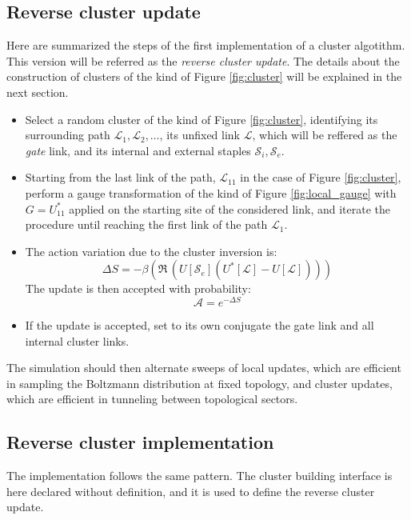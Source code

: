\subsection*{Reverse cluster update}

Here are summarized the steps of the first implementation of a cluster algotithm.
This version will be referred as the \emph{reverse cluster update}.
The details about the construction of clusters of the kind of Figure \ref{fig:cluster}
will be explained in the next section.

\begin{itemize}
    \item
        Select a random cluster of the kind of Figure \ref{fig:cluster},
        identifying its surrounding path $\mathcal L_1, \mathcal L_2, \ldots$,
        its unfixed link $\mathcal L$, which will be reffered as the \emph{gate} link,
        and its internal and external staples $\mathcal S_i, \mathcal S_e$.
    \item 
        Starting from the last link of the path,
        $\mathcal L_{11}$ in the case of Figure \ref{fig:cluster},
        perform a gauge transformation of the kind of Figure \ref{fig:local_gauge}
        with $G=U^*_{11}$ applied on the starting site of the considered link,
        and iterate the procedure until reaching the first link of the path $\mathcal L_1$.
    \item
        The action variation due to the cluster inversion is:
        \[
            \Delta S = -\beta(\Re\,(U[\mathcal S_e](U^*[\mathcal L]-U[\mathcal L])))
        \]
        The update is then accepted with probability:
        \[
            \mathcal A = e^{-\Delta S}
        \]
    \item 
        If the update is accepted,
        set to its own conjugate the gate link and all internal cluster links.
\end{itemize}

The simulation should then alternate sweeps of local updates,
which are efficient in sampling the Boltzmann distribution at fixed topology,
and cluster updates, which are efficient in tunneling between topological sectors.

\subsection{Reverse cluster implementation}
The implementation follows the same pattern.
The cluster building interface is here declared without definition,
and it is used to define the reverse cluster update.

